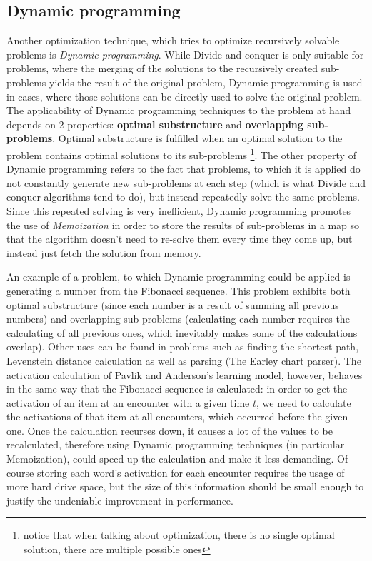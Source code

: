 \documentclass[a4paper]{report}
\begin{document}
\subsection{Dynamic programming}
Another optimization technique, which tries to optimize recursively solvable problems is \textit{Dynamic programming}. While Divide and conquer is only suitable for problems, where the merging of the solutions to the recursively created sub-problems yields the result of the original problem, Dynamic programming is used in cases, where those solutions can be directly used to solve the original problem. The applicability of Dynamic programming techniques to the problem at hand depends on 2 properties: \textbf{optimal substructure} and \textbf{overlapping sub-problems}. Optimal substructure is fulfilled when an optimal solution to the problem contains optimal solutions to its sub-problems \footnote{notice that when talking about optimization, there is no single optimal solution, there are multiple possible ones}. The other property of Dynamic programming refers to the fact that problems, to which it is applied do not constantly generate new sub-problems at each step (which is what Divide and conquer algorithms tend to do), but instead repeatedly solve the same problems. Since this repeated solving is very inefficient, Dynamic programming promotes the use of \textit{Memoization} in order to store the results of sub-problems in a map so that the algorithm doesn't need to re-solve them every time they come up, but instead just fetch the solution from memory. \citep{algs_intro}

An example of a problem, to which Dynamic programming could be applied is generating a number from the Fibonacci sequence. This problem exhibits both optimal substructure (since each number is a result of summing all previous numbers) and overlapping sub-problems (calculating each number requires the calculating of all previous ones, which inevitably makes some of the calculations overlap). Other uses can be found in problems such as finding the shortest path, Levenstein distance calculation as well as parsing (The Earley chart parser). The activation calculation of Pavlik and Anderson's learning model, however, behaves in the same way that the Fibonacci sequence is calculated: in order to get the activation of an item at an encounter with a given time $t$, we need to calculate the activations of that item at all encounters, which occurred before the given one. Once the calculation recurses down, it causes a lot of the values to be recalculated, therefore using Dynamic programming techniques (in particular Memoization), could speed up the calculation and make it less demanding. Of course storing each word's activation for each encounter requires the usage of more hard drive space, but the size of this information should be small enough to justify the undeniable improvement in performance.
\end{document}
